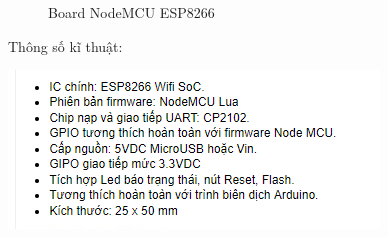 \documentclass[a4paper,12pt,oneside]{article}
\begin{document}
\begin{itemize}
\begin{figure}[h!]
\caption{Board NodeMCU ESP8266}
\end{figure}
\noindent Thông số kĩ thuật:\\
\begin{center}
\includegraphics[scale=1]{hinh/NodeMCUKT.jpg}
\end{center}

\end{itemize}
\end{document}
